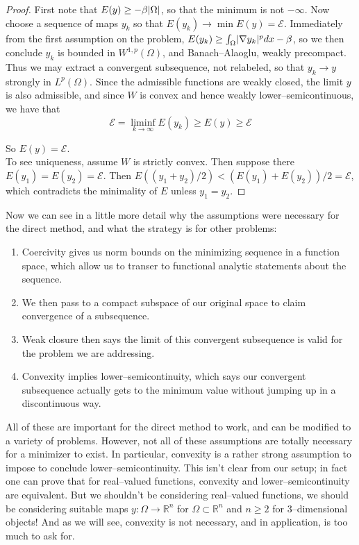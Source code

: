 \documentclass[../main.tex]{subfiles}
\begin{document}
\begin{proof}
	First note that $E(y) \geq - \beta \lvert\Omega\rvert$, so that the minimum is not $- \infty$.
	Now choose a sequence of maps $y_k$ so that $E(y_k) \to \min E(y) = \mathcal{E}$.
	Immediately from the first assumption on the problem, $E(y_k) \geq \int_{\Omega} \lvert\nabla y_k\rvert^{p} dx - \beta$, so we then conclude $y_k$ is bounded in $W^{1,p}(\Omega)$, and Banach--Alaoglu, weakly precompact.
	Thus we may extract a convergent subsequence, not relabeled, so that $y_k \to y$ strongly in $L^p(\Omega)$.
	Since the admissible functions are weakly closed, the limit $y$ is also admissible, and since $W$ is convex and hence weakly lower--semicontinuous, we have that
	\begin{equation*}
		\mathcal{E} = \liminf_{k \to \infty} E(y_k) \geq E(y) \geq \mathcal{E}
	\end{equation*}

	So $E(y) = \mathcal{E}$. \\

	To see uniqueness, assume $W$ is strictly convex.
	Then suppose there $E(y_1) = E(y_2) = \mathcal{E}$.
	Then $E((y_1+y_2)/2) < (E(y_1) + E(y_2))/2 = \mathcal{E}$, which contradicts the minimality of $E$ unless $y_1 = y_2$.
\end{proof}

Now we can see in a little more detail why the assumptions were necessary for the direct method, and what the strategy is for other problems:

\begin{enumerate}
	\item Coercivity gives us norm bounds on the minimizing sequence in a function space, which allow us to transer to functional analytic statements about the sequence.
	\item We then pass to a compact subspace of our original space to claim convergence of a subsequence.
	\item Weak closure then says the limit of this convergent subsequence is valid for the problem we are addressing.
	\item Convexity implies lower--semicontinuity, which says our convergent subsequence actually gets to the minimum value without jumping up in a discontinuous way.
\end{enumerate}


All of these are important for the direct method to work, and can be modified to a variety of problems.
However, not all of these assumptions are totally necessary for a minimizer to exist.
In particular, convexity is a rather strong assumption to impose to conclude lower--semicontinuity.
This isn't clear from our setup; in fact one can prove that for real--valued functions, convexity and lower--semicontinuity are equivalent.
But we shouldn't be considering real--valued functions, we should be considering suitable maps $y: \Omega \to \mathbb{R}^n$ for $\Omega \subset \mathbb{R}^n$ and $n \geq 2$ for 3--dimensional objects!
And as we will see, convexity is not necessary, and in application, is too much to ask for.
\end{document}
